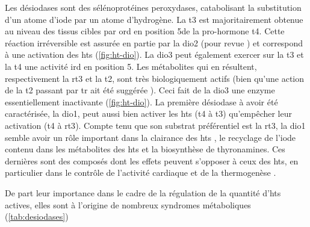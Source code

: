 \documentclass[../main.tex]{subfiles}
\begin{document}
Les désiodases sont des sélénoprotéines peroxydases, catabolisant la substitution d'un atome d'iode par un atome d'hydrogène.
La \gls{t3} est majoritairement obtenue au niveau des tissus cibles par \gls{ord} en position 5\prime de la pro-hormone \gls{t4}.
Cette réaction irréversible est assurée en partie par la \gls{dio2} (pour revue \citealp{Williams2011}) et correspond à une activation des \glspl{ht} (\autoref{fig:ht-dio}).
La \gls{dio3} peut également exercer sur la \gls{t3} et la \gls{t4} une activité \gls{ird} en position 5.
Les métabolites qui en résultent, respectivement la \gls{rt3} et la \gls{t2}, sont très biologiquement actifs (bien qu'une action de la \gls{t2} passant par \gls{tr} ait été suggérée \citealp{Mendoza2013}).
Ceci fait de la \gls{dio3} une enzyme essentiellement inactivante (\autoref{fig:ht-dio}).
La première désiodase à avoir été caractérisée, la \gls{dio1}, peut aussi bien activer les \glspl{ht} (\gls{t4} à \gls{t3}) qu'empêcher leur activation (\gls{t4} à \gls{rt3}).
Compte tenu que son substrat préférentiel est la \gls{rt3}, la \gls{dio1} semble avoir un rôle important dans la clairance des \glspl{ht} \citep{Maia2011}, le recyclage de l'iode contenu dans les métabolites des \glspl{ht} \citep{Schneider2006} et la biosynthèse de thyronamines.
Ces dernières sont des composés dont les effets peuvent s'opposer à ceux des \glspl{ht}, en particulier dans le contrôle de l'activité cardiaque et de la thermogenèse \citep{Scanlan2004}.
\par
De part leur importance dans le cadre de la régulation de la quantité d'\glspl{ht} actives, elles sont à l'origine de nombreux syndromes métaboliques (\autoref{tab:desiodases})


\end{document}
